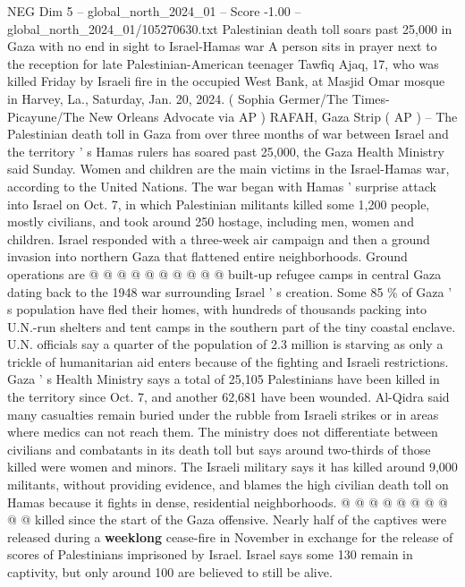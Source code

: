 \begin{textsample}{NEG Dim 5 – global\_north\_2024\_01 – Score -1.00 – global\_north\_2024\_01/105270630.txt}  \label{ex:f5_neg_312}
Palestinian death toll soars past 25,000 in Gaza with no end in sight to Israel-Hamas war A person sits in prayer next to the reception for late Palestinian-American teenager Tawfiq Ajaq, 17, who was killed Friday by Israeli fire in the occupied West Bank, at Masjid Omar mosque in Harvey, La., Saturday, Jan. 20, 2024. ( Sophia Germer/The Times-Picayune/The New Orleans Advocate via AP ) RAFAH, Gaza Strip ( AP ) -- The Palestinian death toll in Gaza from over three months of war between Israel and the territory ' s Hamas rulers has soared past 25,000, the Gaza Health Ministry said Sunday.
Women and children are the main victims in the Israel-Hamas war, according to the United Nations.
The war began with Hamas ' surprise attack into Israel on Oct. 7, in which Palestinian militants killed some 1,200 people, mostly civilians, and took around 250 hostage, including men, women and children.
Israel responded with a three-week air campaign and then a ground invasion into northern Gaza that flattened entire neighborhoods.
Ground operations are @ @ @ @ @ @ @ @ @ @ built-up refugee camps in central Gaza dating back to the 1948 war surrounding Israel ' s creation.
Some 85 \% of Gaza ' s population have fled their homes, with hundreds of thousands packing into U.N.-run shelters and tent camps in the southern part of the tiny coastal enclave.
U.N. officials say a quarter of the population of 2.3 million is starving as only a trickle of humanitarian aid enters because of the fighting and Israeli restrictions.
Gaza ' s Health Ministry says a total of 25,105 Palestinians have been killed in the territory since Oct. 7, and another 62,681 have been wounded.
Al-Qidra said many casualties remain buried under the rubble from Israeli strikes or in areas where medics can not reach them.
The ministry does not differentiate between civilians and combatants in its death toll but says around two-thirds of those killed were women and minors.
The Israeli military says it has killed around 9,000 militants, without providing evidence, and blames the high civilian death toll on Hamas because it fights in dense, residential neighborhoods. @ @ @ @ @ @ @ @ @ @ killed since the start of the Gaza offensive.
Nearly half of the captives were released during a \textbf{weeklong} cease-fire in November in exchange for the release of scores of Palestinians imprisoned by Israel.
Israel says some 130 remain in captivity, but only around 100 are believed to still be alive.

\end{textsample}
